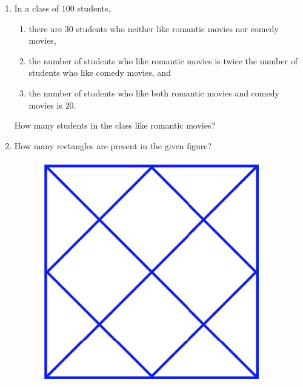 \documentclass[a4paper, 11pt]{article}
\begin{document}
\begin{enumerate}
    \hfill{}
    
    \item In a class of $100$ students,
    \begin{enumerate}[label=\brak{\roman*}]
        \item there are $30$ students who neither like romantic movies nor comedy movies,
        \item the number of students who like romantic movies is twice the number of students who like comedy movies, and
        \item the number of students who like both romantic movies and comedy movies is $20$.
    \end{enumerate}
    How many students in the class like romantic movies?
    
    \begin{enumerate}
    \end{enumerate}
    
    \hfill{}
    
    \item How many rectangles are present in the given figure?
    \begin{figure}[H]
        \centering
        \includegraphics[width=0.3\columnwidth]{figs/GA5.png}
        \caption*{}
        \label{fig:q5}
    \end{figure}
    
    \begin{enumerate}
    \end{enumerate}
    

\end{enumerate}
\end{document}
